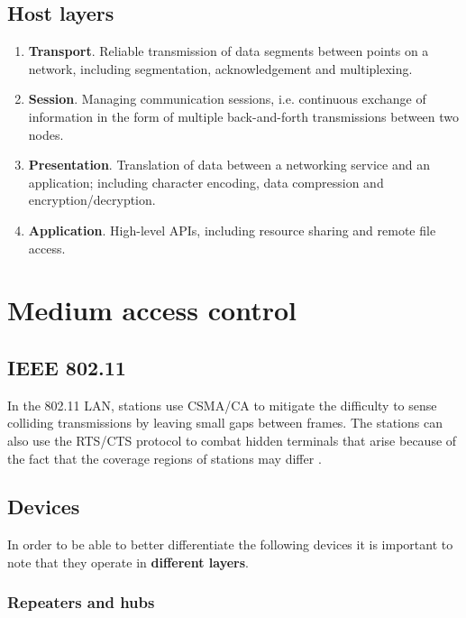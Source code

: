 \subsection{Host layers}

\begin{enumerate}
\item \textbf{Transport}. Reliable transmission of data segments between points on a network, including segmentation, acknowledgement and multiplexing.
\item \textbf{Session}. Managing communication sessions, i.e. continuous exchange of information in the form of multiple back-and-forth transmissions between two nodes.
\item \textbf{Presentation}. Translation of data between a networking service and an application; including character encoding, data compression and encryption/decryption.
\item \textbf{Application}. High-level APIs, including resource sharing and remote file access.
\end{enumerate}

\section{Medium access control}

\subsection{IEEE 802.11}

In the 802.11 LAN, stations use CSMA/CA to mitigate the difficulty to sense colliding transmissions by leaving small gaps between frames. The stations can also use the RTS/CTS protocol to combat hidden terminals that arise because of the fact that the coverage regions of stations may differ  \cite[p.~349]{computer-networks-tanenbaum-2012}.

\subsection{Devices}

In order to be able to better differentiate the following devices it is important to note that they operate in \textbf{different layers}.

\subsubsection{Repeaters and hubs}

